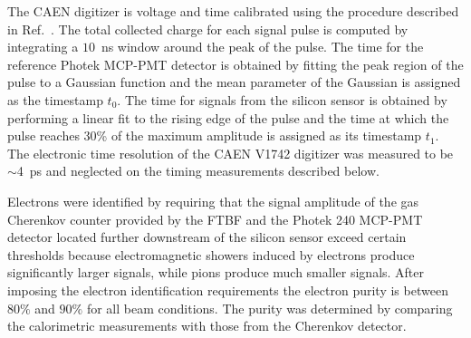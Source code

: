 The CAEN digitizer is voltage and time calibrated using the  procedure
described in Ref.~\cite{Kim201467}. The total collected charge for each signal
pulse is computed by integrating a $10$~ns window around the peak of the pulse.
The time for the reference Photek MCP-PMT detector is obtained by fitting the
peak region of the pulse to a Gaussian function and the mean parameter of the
Gaussian is assigned as the timestamp $t_0$. The time for signals from the
silicon sensor is obtained by performing a linear fit to the rising edge of the
pulse and the time at which the pulse reaches 30\% of the maximum amplitude is
assigned as its timestamp $t_1$. The electronic time resolution
of the CAEN V1742 digitizer was measured to be $\sim$4~ps and
neglected on the timing measurements described below.

Electrons were identified by requiring that the signal amplitude of the gas Cherenkov counter
provided by the FTBF and the Photek 240 MCP-PMT detector located further
downstream of the silicon sensor exceed certain thresholds because electromagnetic showers induced by electrons
produce significantly larger signals, while pions produce much smaller signals. After imposing the electron identification requirements the electron purity is between $80\%$ and $90\%$ for all beam
conditions. The purity was determined by comparing the calorimetric measurements with those 
from the Cherenkov detector.

